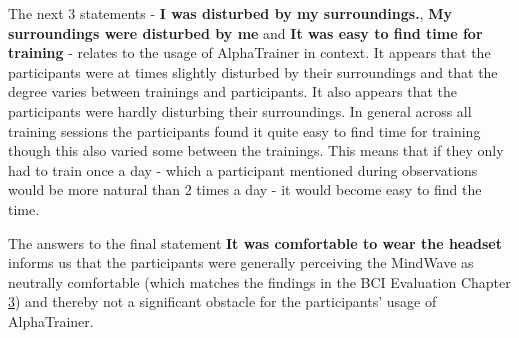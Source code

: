 \documentclass[a4paper,10pt,english,lof,lot,twoside]{puthesis}
\begin{document}
The next 3 statements - \textbf{I was disturbed by my surroundings.}, \textbf{My surroundings were disturbed by me} and \textbf{It was easy to find time for training} - relates to the usage of AlphaTrainer in context. It appears that the participants were at times slightly disturbed by their surroundings and that the degree varies between trainings and participants. It also appears that the participants were hardly disturbing their surroundings. In general across all training sessions the participants found it quite easy to find time for training though this also varied some between the trainings. This means that if they only had to train once a day - which a participant mentioned during observations would be more natural than 2 times a day - it would become easy to find the time.

The answers to the final statement \textbf{It was comfortable to wear the headset} informs us that the participants were generally perceiving the MindWave as neutrally comfortable (which matches the findings in the BCI Evaluation Chapter {\hyperref[ch-experiment/index:ch-experiment]{3}}) and thereby not a significant obstacle for the participants' usage of AlphaTrainer.
\end{document}
